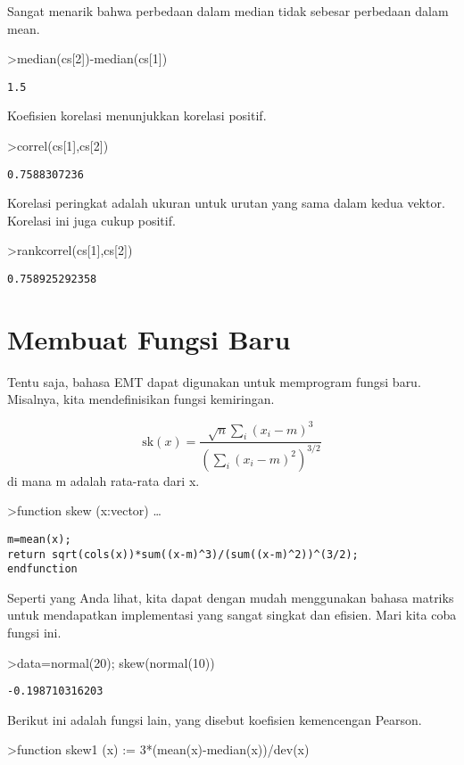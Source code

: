 \documentclass[
]{book}
\begin{document}
Sangat menarik bahwa perbedaan dalam median tidak sebesar perbedaan dalam mean.

\textgreater median(cs{[}2{]})-median(cs{[}1{]})

\begin{verbatim}
1.5
\end{verbatim}

Koefisien korelasi menunjukkan korelasi positif.

\textgreater correl(cs{[}1{]},cs{[}2{]})

\begin{verbatim}
0.7588307236
\end{verbatim}

Korelasi peringkat adalah ukuran untuk urutan yang sama dalam kedua vektor. Korelasi ini juga cukup positif.

\textgreater rankcorrel(cs{[}1{]},cs{[}2{]})

\begin{verbatim}
0.758925292358
\end{verbatim}

\chapter{Membuat Fungsi Baru}\label{membuat-fungsi-baru}

Tentu saja, bahasa EMT dapat digunakan untuk memprogram fungsi baru. Misalnya, kita mendefinisikan fungsi kemiringan.

\[\text{sk}(x) = \dfrac{\sqrt{n} \sum_i (x_i-m)^3}{\left(\sum_i (x_i-m)^2\right)^{3/2}}\]di mana m adalah rata-rata dari x.

\textgreater function skew (x:vector) \ldots{}

\begin{verbatim}
m=mean(x);
return sqrt(cols(x))*sum((x-m)^3)/(sum((x-m)^2))^(3/2);
endfunction
\end{verbatim}

Seperti yang Anda lihat, kita dapat dengan mudah menggunakan bahasa matriks untuk mendapatkan implementasi yang sangat singkat dan efisien. Mari kita coba fungsi ini.

\textgreater data=normal(20); skew(normal(10))

\begin{verbatim}
-0.198710316203
\end{verbatim}

Berikut ini adalah fungsi lain, yang disebut koefisien kemencengan Pearson.

\textgreater function skew1 (x) := 3*(mean(x)-median(x))/dev(x)
\end{document}
